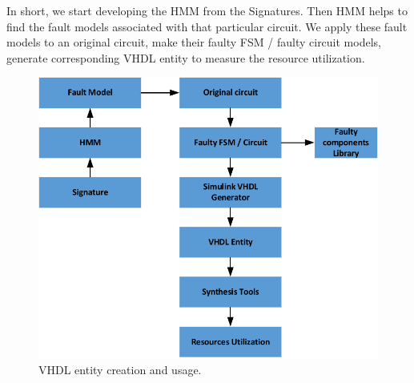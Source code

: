 In short, we start developing the HMM from the Signatures. Then HMM helps to find the fault models associated with that particular circuit. We apply these fault models to an original circuit, make their faulty FSM / faulty circuit models, generate corresponding VHDL entity to measure the resource utilization.
%
%
\begin{figure}[tb!]
 \centering
  \captionsetup{justification=centering}    
   \includegraphics[scale=0.8]{Figures/library.pdf}
   \caption{VHDL entity creation and usage.}
\label{fig:library1}
\end{figure}

